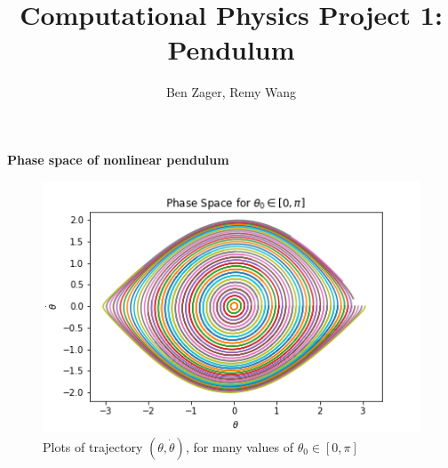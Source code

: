 \documentclass[12pt]{article}
\newenvironment{problem}[2][]{\begin{trivlist}
\item[\hskip \labelsep {\bfseries #1}\hskip \labelsep {\bfseries #2.}]}{\end{trivlist}}
\begin{document}
  
\title{Computational Physics Project 1: Pendulum}
\author{Ben Zager, Remy Wang}
\maketitle
 
\begin{problem}{1}
	\textbf{Phase space of nonlinear pendulum}

\begin{figure}[ht!]
  \includegraphics[scale=0.7]{../figures/phaseSpace.png}
  \caption{Plots of trajectory $(\theta,\dot{\theta})$, for many values of $\theta_{0} \in [0,\pi]$}
  \label{phase}
\end{figure}


\end{problem}
\end{document}
